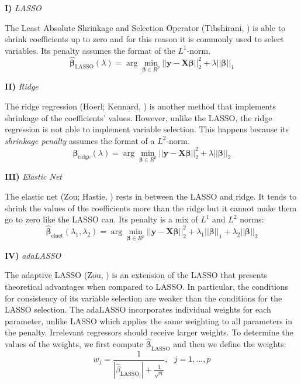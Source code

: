 \documentclass[12pt,openright,twoside,a4paper,brazil,english,emptypage,openany]{abntex2}
\begin{document}
\textbf{I)} \textit{LASSO}

The Least Absolute Shrinkage and Selection Operator (Tibshirani, \citeyear{tibshirani1996regression}) is able to shrink coefficients up to zero and for this reason it is commonly used to select variables. Its penalty assumes the format of the $L^1$-norm. 
\begin{equation*}
    \bm{\hat{\beta}}_{\text{LASSO}}(\lambda) = \arg \min_{\bm{\beta} \in R^p}  ||\bm{y}-\bm{X \beta}||_2^2 + \lambda ||\bm{\beta}||_1
\end{equation*}  


\textbf{II)} \textit{Ridge}

The ridge regression (Hoerl;
Kennard, \citeyear{ridge}) is another method that implements shrinkage of the coefficients' values. However, unlike the LASSO, the ridge regression is not able to implement variable selection. This happens because its \textit{shrinkage penalty} assumes the format of a $L^2$-norm.
\begin{equation*}
    \bm{\hat{\beta}}_{\text{ridge}}(\lambda) = \arg \min_{\bm{\beta} \in R^p}  ||\bm{y}-\bm{X \beta}||_2^2 + \lambda ||\bm{\beta}||_2
\end{equation*}  

\textbf{III)} \textit{Elastic Net}

The elastic net (Zou; Hastie, \citeyear{elnet}) rests in between the LASSO and ridge. It tends to shrink the values of the coefficients more than the ridge but it cannot make them go to zero like the LASSO can. Its penalty is a mix of $L^1$ and $L^2$ norms:
\begin{equation*}
    \bm{\hat{\beta}}_{\text{elnet}}(\lambda_1, \lambda_2) = \arg \min_{\bm{\beta} \in R^p}  ||\bm{y}-\bm{X \beta}||_2^2 + \lambda_1 ||\bm{\beta}||_1 + \lambda_2 ||\bm{\beta}||_2
\end{equation*}  

\textbf{IV)} \textit{adaLASSO}

The adaptive LASSO (Zou, \citeyear{adalasso}) is an extension of the LASSO that presents theoretical advantages when compared to LASSO. In particular, the conditions for consistency of its variable selection are weaker than the conditions for the LASSO selection. The adaLASSO incorporates individual weights for each parameter, unlike LASSO which applies the same weighting to all parameters in the penalty. Irrelevant regressors should receive larger weights. To determine the values of the weights, we first compute $\bm{\hat{\beta}}_{\text{LASSO}}$ and then we define the weights:
$$w_j = \frac{1}{|\hat{\beta}_{\text{LASSO}_j}| + \frac{1}{\sqrt{n}}}, \text{ } j=1,...,p $$
\end{document}
